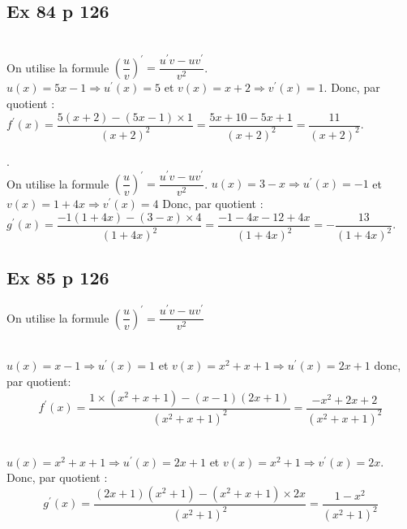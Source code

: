 \documentclass[12pt,a5paper]{book}
\begin{document}
\subsection*{Ex 84 p 126}
\begin{enumMet}
    \item {}\\
    On utilise la formule $\left(\dfrac{u}{v}\right)^{\prime}=\dfrac{u^{\prime} v-u v^{\prime}}{v^{2}}$.\\
    $u(x)=5 x-1 \Rightarrow u^{\prime}(x)=5$ et $v(x)=x+2 \Rightarrow v^{\prime}(x)=1$.
    Donc, par quotient :\\
    $f^{\prime}(x)=\dfrac{5(x+2)-(5 x-1) \times 1}{(x+2)^{2}}=\dfrac{5 x+10-5 x+1}{(x+2)^{2}}=\dfrac{11}{(x+2)^{2}}$.
    \item {}.\\
    On utilise la formule $\left(\dfrac{u}{v}\right)^{\prime}=\dfrac{u^{\prime} v-u v^{\prime}}{v^{2}}$.
    $u(x)=3-x \Rightarrow u^{\prime}(x)=-1$ et $v(x)=1+4 x \Rightarrow v^{\prime}(x)=4$
    Donc, par quotient :\\ 
    $g^{\prime}(x)=\dfrac{-1(1+4 x)-(3-x) \times 4}{(1+4 x)^{2}}=\dfrac{-1-4 x-12+4 x}{(1+4 x)^{2}}=-\dfrac{13}{(1+4 x)^{2}}$.
\end{enumMet}

\newpage
\subsection*{Ex 85 p 126}
On utilise la formule $\left(\dfrac{u}{v}\right)^{\prime}=\dfrac{u^{\prime} v-u v^{\prime}}{v^{2}}$
\begin{enumMet}
    \item {}\\
    $u(x)=x-1 \Rightarrow u^{\prime}(x)=1$ et $v(x)=x^{2}+x+1 \Rightarrow u^{\prime}(x)=2 x+1$
donc, par quotient:\\
$$f^{\prime}(x)=\dfrac{1 \times\left(x^{2}+x+1\right)-(x-1)(2 x+1)}{\left(x^{2}+x+1\right)^{2}}=\dfrac{-x^{2}+2 x+2}{\left(x^{2}+x+1\right)^{2}}$$
    \item {}\\
    $u(x)=x^{2}+x+1 \Rightarrow u^{\prime}(x)=2 x+1$ et $v(x)=x^{2}+1 \Rightarrow v^{\prime}(x)=2 x$. Donc, par quotient :\\
$$g^{\prime}(x)=\dfrac{(2 x+1)\left(x^{2}+1\right)-\left(x^{2}+x+1\right) \times 2x}{\left(x^{2}+1\right)^{2}}=\dfrac{1-x^{2}}{\left(x^{2}+1\right)^{2}}$$
\end{enumMet}
\end{document}
